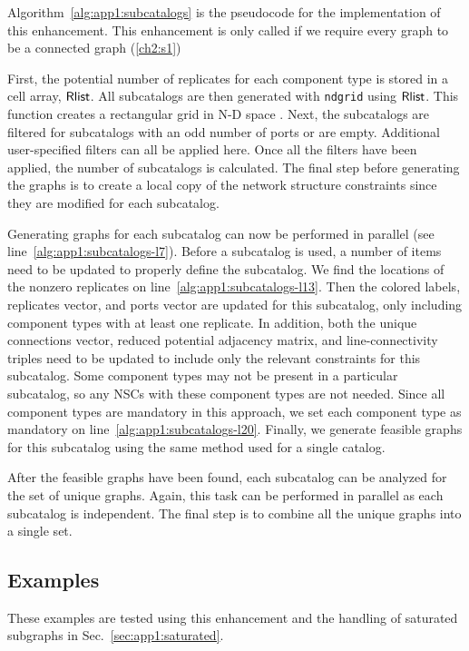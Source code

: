 

Algorithm~\ref{alg:app1:subcatalogs} is the pseudocode for the implementation of this enhancement.
This enhancement is only called if we require every graph to be a connected graph (\ref{ch2:s1})

First, the potential number of replicates for each component type is stored in a cell array, $\textup{\textsf{Rlist}}$.
All subcatalogs are then generated with \texttt{ndgrid} using $\textup{\textsf{Rlist}}$.
This function creates a rectangular grid in N-D space \cite{matlab-ndgrid}.
Next, the subcatalogs are filtered for subcatalogs with an odd number of ports or are empty. Additional user-specified filters can all be applied here. Once all the filters have been applied, the number of subcatalogs is calculated.
The final step before generating the graphs is to create a local copy of the network structure constraints since they are modified for each subcatalog.

Generating graphs for each subcatalog can now be performed in parallel (see line~\ref{alg:app1:subcatalogs-l7}).
Before a subcatalog is used, a number of items need to be updated to properly define the subcatalog.
We find the locations of the nonzero replicates on line~\ref{alg:app1:subcatalogs-l13}.
Then the colored labels, replicates vector, and ports vector are updated for this subcatalog, only including component types with at least one replicate.
In addition, both the unique connections vector, reduced potential adjacency matrix, and line-connectivity triples need to be updated to include only the relevant constraints for this subcatalog.
Some component types may not be present in a particular subcatalog, so any NSCs with these component types are not needed.
Since all component types are mandatory in this approach, we set each component type as mandatory on line~\ref{alg:app1:subcatalogs-l20}.
Finally, we generate feasible graphs for this subcatalog using the same method used for a single catalog.

After the feasible graphs have been found, each subcatalog can be analyzed for the set of unique graphs. Again, this task can be performed in parallel as each subcatalog is independent. 
The final step is to combine all the unique graphs into a single set.

\subsection{Examples}

These examples are tested using this enhancement and the handling of saturated subgraphs in Sec.~\ref{sec:app1:saturated}.

